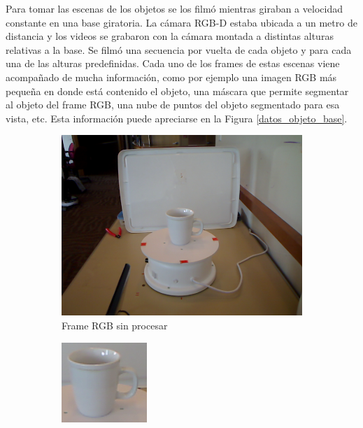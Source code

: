Para tomar las escenas de los objetos se los filmó mientras giraban a velocidad constante en una base giratoria. La cámara RGB-D estaba ubicada a un metro de distancia y los videos se grabaron con la cámara montada a distintas alturas relativas a la base. Se filmó una secuencia por vuelta de cada objeto y para cada una de las alturas predefinidas. Cada uno de los frames de estas escenas viene acompañado de mucha información, como por ejemplo una imagen RGB más pequeña en donde está contenido el objeto, una máscara que permite segmentar al objeto del frame RGB, una nube de puntos del objeto segmentado para esa vista, etc. Esta información puede apreciarse en la Figura \ref{datos_objeto_base}.

\begin{figure}
    \centering
    \begin{subfigure}[b]{0.4\textwidth}
        \includegraphics[width=\textwidth]{img/base_rgbd/scene.png}
        \caption{Frame RGB sin procesar}
    \end{subfigure}
    \quad
    \begin{subfigure}[b]{0.4\textwidth}
        \includegraphics[width=\textwidth]{img/base_rgbd/crop.png}

\end{subfigure}
\end{figure}
